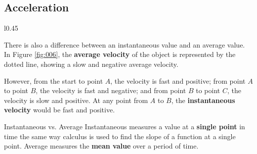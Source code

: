 \documentclass[12pt, letterpaper]{article}
\begin{document}
\subsection{Acceleration}

\begin{wrapfigure}[11]{l}{0.45\textwidth}
  \centering
  
  \caption{Instantaneous vs. Average Velocity}
  \label{fig:006}
\end{wrapfigure}

There is also a difference between an instantaneous value and an average value. In Figure
\ref{fig:006}, the \textbf{average velocity} of the object is represented by the dotted line,
showing a slow and negative average velocity.

However, from the start to point $A$, the velocity is fast and positive; from point $A$ to
point $B$, the velocity is fast and negative; and from point $B$ to point $C$, the velocity
is slow and positive. At any point from $A$ to $B$, the \textbf{instantaneous velocity} would be
fast and positive.

\begin{definition}{Instantaneous vs. Average}
  Instantaneous measures a value at a \textbf{single point} in time the same way calculus
  is used to find the slope of a function at a single point. Average measures the
  \textbf{mean value} over a period of time.
\end{definition}
\end{document}
